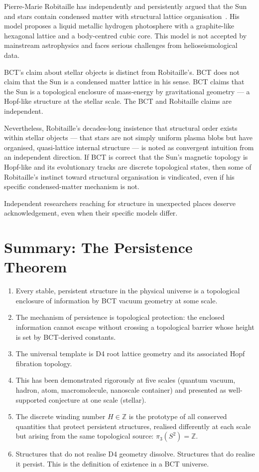 \documentclass[aps,prl,preprint,superscriptaddress,floatfix]{revtex4-2}
\begin{document}
Pierre-Marie Robitaille has independently and persistently argued
that the Sun and stars contain condensed matter with structural
lattice organisation~\cite{robitaille2011,robitaille2013}. His
model proposes a liquid metallic hydrogen photosphere with a
graphite-like hexagonal lattice and a body-centred cubic core.
This model is not accepted by mainstream astrophysics and faces
serious challenges from helioseismological data.

BCT's claim about stellar objects is distinct from Robitaille's.
BCT does not claim that the Sun is a condensed matter lattice in
his sense. BCT claims that the Sun is a topological enclosure
of mass-energy by gravitational geometry --- a Hopf-like structure
at the stellar scale. The BCT and Robitaille claims are independent.

Nevertheless, Robitaille's decades-long insistence that structural
order exists within stellar objects --- that stars are not simply
uniform plasma blobs but have organised, quasi-lattice internal
structure --- is noted as convergent intuition from an independent
direction. If BCT is correct that the Sun's magnetic topology
is Hopf-like and its evolutionary tracks are discrete topological
states, then some of Robitaille's instinct toward structural
organisation is vindicated, even if his specific condensed-matter
mechanism is not.

Independent researchers reaching for structure in unexpected places
deserve acknowledgement, even when their specific models differ.

\section{Summary: The Persistence Theorem}

\begin{enumerate}
\item Every stable, persistent structure in the physical universe
  is a topological enclosure of information by BCT vacuum geometry
  at some scale.
\item The mechanism of persistence is topological protection:
  the enclosed information cannot escape without crossing a
  topological barrier whose height is set by BCT-derived constants.
\item The universal template is D4 root lattice geometry and its
  associated Hopf fibration topology.
\item This has been demonstrated rigorously at five scales
  (quantum vacuum, hadron, atom, macromolecule, nanoscale container)
  and presented as well-supported conjecture at one scale (stellar).
\item The discrete winding number $H \in \mathbb{Z}$ is the
  prototype of all conserved quantities that protect persistent
  structures, realised differently at each scale but arising
  from the same topological source: $\pi_3(S^2) = \mathbb{Z}$.
\item Structures that do not realise D4 geometry dissolve.
  Structures that do realise it persist. This is the definition
  of existence in a BCT universe.
\end{enumerate}
\end{document}
